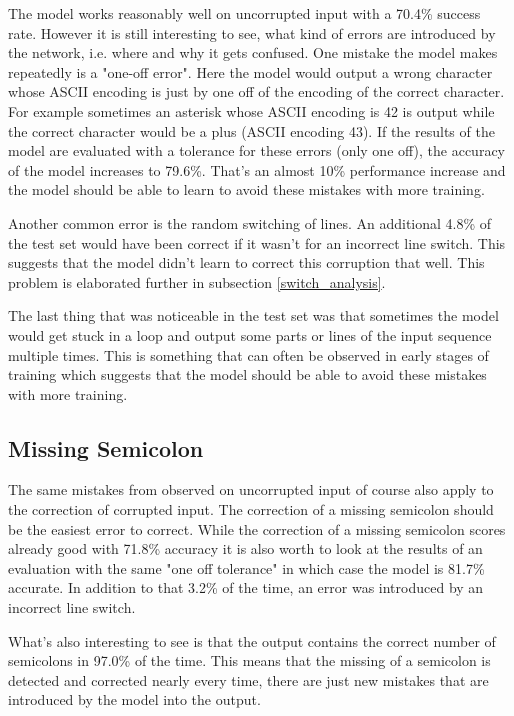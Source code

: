 The model works reasonably well on uncorrupted input with a 70.4\% success rate. However it is still interesting to see, what kind of errors are introduced by the network, i.e. where and why it gets confused. One mistake the model makes repeatedly is a "one-off error". Here the model would output a wrong character whose ASCII encoding is just by one off of the encoding of the correct character. For example sometimes an asterisk whose ASCII encoding is 42 is output while the correct character would be a plus (ASCII encoding 43). If the results of the model are evaluated with a tolerance for these errors (only one off), the accuracy of the model increases to 79.6\%. That's an almost 10\% performance increase and the model should be able to learn to avoid these mistakes with more training.

Another common error is the random switching of lines. An additional 4.8\% of the test set would have been correct if it wasn't for an incorrect line switch. This suggests that the model didn't learn to correct this corruption that well. This problem is elaborated further in subsection \ref{switch_analysis}.

The last thing that was noticeable in the test set was that sometimes the model would get stuck in a loop and output some parts or lines of the input sequence multiple times. This is something that can often be observed in early stages of training which suggests that the model should be able to avoid these mistakes with more training.

\subsection{Missing Semicolon}

The same mistakes from observed on uncorrupted input of course also apply to the correction of corrupted input. The correction of a missing semicolon should be the easiest error to correct. While the correction of a missing semicolon scores already good with 71.8\% accuracy it is also worth to look at the results of an evaluation with the same "one off tolerance" in which case the model is 81.7\% accurate. In addition to that 3.2\% of the time, an error was introduced by an incorrect line switch.

What's also interesting to see is that the output contains the correct number of semicolons in 97.0\% of the time. This means that the missing of a semicolon is detected and corrected nearly every time, there are just new mistakes that are introduced by the model into the output.

